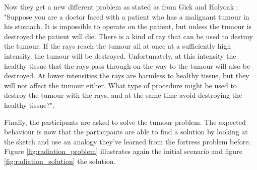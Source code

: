 \documentclass[12pt]{article}
\begin{document}
Now they get a new different problem as stated as from Gick and Holyoak \cite[pp. 307-308]{gick1980analogical}: "Suppose you are a doctor faced with a patient who has a malignant tumour in his stomach. It is impossible to operate on the patient, but unless the tumour is destroyed the patient will die. There is a kind of ray that can be used to destroy the tumour. If  the rays reach the tumour all at once at a sufficiently high intensity, the tumour will be destroyed. Unfortunately, at this intensity the healthy tissue that the rays pass through on the way to the tumour will also be destroyed. At lower intensities the rays are harmless to healthy tissue, but they will not affect the tumour either. What type of procedure might be used to destroy the tumour with the rays, and at the same time avoid destroying the healthy tissue?". 

Finally, the participants are asked to solve the tumour problem. The expected behaviour is now that the participants are able to find a solution by looking at the sketch and use an analogy they've learned from the fortress problem before. Figure \ref{fig:radiation_problem} illustrates again the initial scenario and figure \ref{fig:radiation_solution} the solution.
\end{document}
